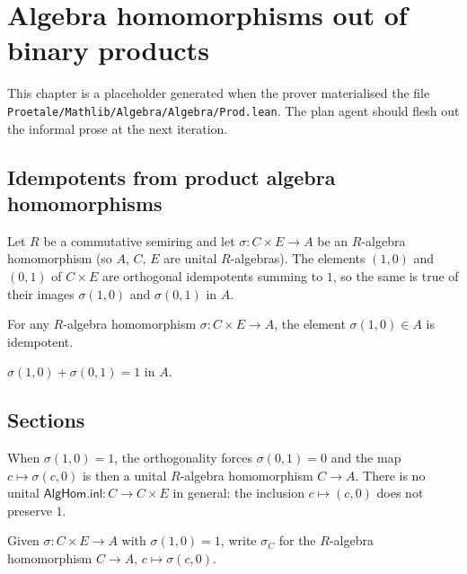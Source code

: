\chapter{Algebra homomorphisms out of binary products}
\label{ch:mathlib-algebra-prod}

This chapter is a placeholder generated when the prover materialised the file
\texttt{Proetale/Mathlib/Algebra/Algebra/Prod.lean}. The plan agent should
flesh out the informal prose at the next iteration.

\section{Idempotents from product algebra homomorphisms}

Let $R$ be a commutative semiring and let $\sigma : C \times E \to A$ be an
$R$-algebra homomorphism (so $A$, $C$, $E$ are unital $R$-algebras). The
elements $(1, 0)$ and $(0, 1)$ of $C \times E$ are orthogonal idempotents
summing to $1$, so the same is true of their images $\sigma(1, 0)$ and
$\sigma(0, 1)$ in $A$.

\begin{lemma}
  \label{lem:apply-inl-idempotent}
  \leanok
  For any $R$-algebra homomorphism $\sigma : C \times E \to A$,
  the element $\sigma(1, 0) \in A$ is idempotent.
\end{lemma}

\begin{lemma}
  \label{lem:apply-inl-add-apply-inr}
  \leanok
  $\sigma(1, 0) + \sigma(0, 1) = 1$ in $A$.
\end{lemma}

\section{Sections}

When $\sigma(1, 0) = 1$, the orthogonality forces $\sigma(0, 1) = 0$ and the
map $c \mapsto \sigma(c, 0)$ is then a unital $R$-algebra homomorphism
$C \to A$. There is no unital \(\textsf{AlgHom.inl} : C \to C \times E\) in
general: the inclusion $c \mapsto (c, 0)$ does not preserve $1$.

\begin{definition}
  \label{def:compFstSection}
  \leanok
  Given $\sigma : C \times E \to A$ with $\sigma(1, 0) = 1$, write
  $\sigma_C$ for the $R$-algebra homomorphism $C \to A$, $c \mapsto \sigma(c, 0)$.
\end{definition}

